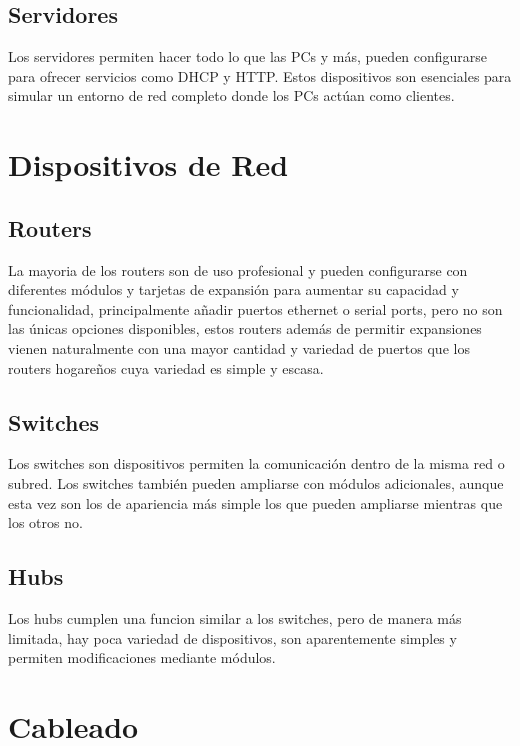 \documentclass{article}
\begin{document}
\subsection{Servidores}
\hspace{1cm}
Los servidores permiten hacer todo lo que las PCs y más, pueden configurarse para ofrecer servicios como DHCP y HTTP. Estos dispositivos son esenciales para simular un entorno de red completo donde los PCs actúan como clientes.

\section{Dispositivos de Red}

\subsection{Routers}
\hspace{1cm}
La mayoria de los routers son de uso profesional y pueden configurarse con diferentes módulos y tarjetas de expansión para aumentar su capacidad y funcionalidad, principalmente añadir puertos ethernet o serial ports, pero no son las únicas opciones disponibles, estos routers además de permitir expansiones vienen naturalmente con una mayor cantidad y variedad de puertos que los routers hogareños cuya variedad es simple y escasa.

\subsection{Switches}
\hspace{1cm}
Los switches son dispositivos permiten la comunicación dentro de la misma red o subred. Los switches también pueden ampliarse con módulos adicionales, aunque esta vez son los de apariencia más simple los que pueden ampliarse mientras que los otros no.

\subsection{Hubs}
\hspace{1cm}
Los hubs cumplen una funcion similar a los switches, pero de manera más limitada, hay poca variedad de dispositivos, son aparentemente simples y permiten modificaciones mediante módulos.

\section{Cableado}
\hspace{1cm}
\end{document}
